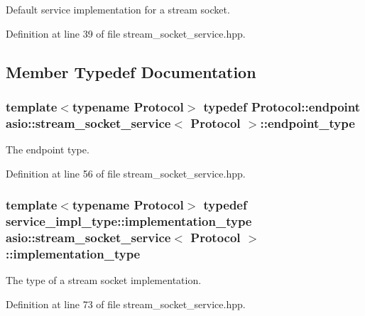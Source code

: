 Default service implementation for a stream socket. 

Definition at line 39 of file stream\+\_\+socket\+\_\+service.\+hpp.



\subsection{Member Typedef Documentation}
\hypertarget{classasio_1_1stream__socket__service_a02567f4db6df303c08c6dadc09e76273}{}
\subsubsection[{endpoint\+\_\+type}]{\setlength{\rightskip}{0pt plus 5cm}template$<$typename Protocol$>$ typedef Protocol\+::endpoint {\bf asio\+::stream\+\_\+socket\+\_\+service}$<$ Protocol $>$\+::{\bf endpoint\+\_\+type}}\label{classasio_1_1stream__socket__service_a02567f4db6df303c08c6dadc09e76273}


The endpoint type. 



Definition at line 56 of file stream\+\_\+socket\+\_\+service.\+hpp.

\hypertarget{classasio_1_1stream__socket__service_a3e2c55b4aaf6bab6dfa83c8dbf5b236a}{}
\subsubsection[{implementation\+\_\+type}]{\setlength{\rightskip}{0pt plus 5cm}template$<$typename Protocol$>$ typedef {\bf service\+\_\+impl\+\_\+type\+::implementation\+\_\+type} {\bf asio\+::stream\+\_\+socket\+\_\+service}$<$ Protocol $>$\+::{\bf implementation\+\_\+type}}\label{classasio_1_1stream__socket__service_a3e2c55b4aaf6bab6dfa83c8dbf5b236a}


The type of a stream socket implementation. 



Definition at line 73 of file stream\+\_\+socket\+\_\+service.\+hpp.

